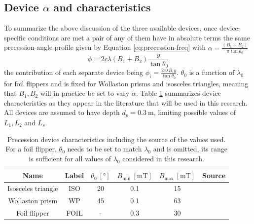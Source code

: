 \subsection{Device $\alpha$ and characteristics}
\label{c3.3.4}
To summarize the above discussion of the three available devices, once device-specific conditions are met a pair of any of them have in absolute terms the same precession-angle profile given by Equation \eqref{eq:precession-freq} with $\alpha = \frac{(B_1 + B_2)}{\pi\tan\theta_0}$
\begin{equation}
	\phi = 2c\lambda (B_1 + B_2)\frac{y}{\tan\theta_0} \label{eq:device-prec}
\end{equation}
the contribution of each separate device being $\phi_i = \frac{2c\lambda B_i y}{\tan\theta_0}$. $\theta_0$ is a function of $\lambda_0$ for foil flippers and is fixed for Wollaston prisms and isosceles triangles, meaning that $B_1, B_2$ will in practice be set to vary $\alpha$. Table \ref{tab:device-properties} summarizes device characteristics as they appear in the literature that will be used in this research. All devices are assumed to have depth $d_p = \SI{0.3}{\meter}$, limiting possible values of $L_1, L_2$ and $L_s$. 
\begin{table}[h!]
	\centering
	\begin{tabular}{c|c c c c c}
		\toprule
		Name & Label & $\theta_0~[\unit{\degree}]$ & $B_{\text{min}}~[\unit{\milli\tesla}]$ & $B_{\text{max}} ~[\unit{\milli\tesla}]$ & Source \\
		\midrule
		Isosceles triangle & ISO & \num{20} & \num{0.1} & \num{15} & \cite{kusmin2017} \\
		Wollaston prism & WP & \num{45} & \num{0.1} & \num{63} & \cite{li2021} \\
		Foil flipper & FOIL & - & \num{0.3} & \num{30} & \cite{bouwman2011} \\
		\bottomrule
	\end{tabular}
	\caption{Precession device characteristics including the source of the values used. For a foil flipper, $\theta_0$ needs to be set to match $\lambda_0$ and is omitted, its range is sufficient for all values of $\lambda_0$ considered in this research.}
	\label{tab:device-properties}
\end{table}
